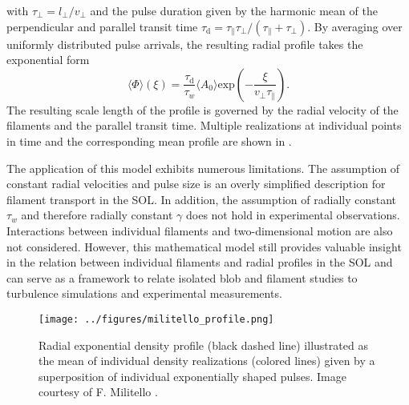 with $\tau_\perp = l_\perp/v_\perp$ and the pulse duration given by the harmonic mean of the perpendicular and parallel transit time $\tau_\mathrm{d} = \tau_\parallel\tau_\perp/(\tau_\parallel+\tau_\perp)$. By averaging over uniformly distributed pulse arrivals, the resulting radial profile takes the exponential form
\begin{equation}
	\langle\Phi\rangle(\xi) = \frac{\tau_\mathrm{d}}{\tau_w}\langle A_0\rangle\mathrm{exp}\left(-\frac{\xi}{v_\perp\tau_\parallel}\right).
\end{equation}
The resulting scale length of the profile is governed by the radial velocity of the filaments and the parallel transit time. Multiple realizations at individual points in time and the corresponding mean profile are shown in . 

The application of this model exhibits numerous limitations. The assumption of constant radial velocities and pulse size is an overly simplified description for filament transport in the SOL. In addition, the assumption of radially constant $\tau_w$ and therefore radially constant $\gamma$ does not hold in experimental observations. Interactions between individual filaments and two-dimensional motion are also not considered. However, this mathematical model still provides valuable insight in the relation between individual filaments and radial profiles in the SOL and can serve as a framework to relate isolated blob and filament studies to turbulence simulations and experimental measurements. 

\begin{figure}[t]
	\centering
	\texttt{[image: ../figures/militello\_profile.png]}
	\caption{Radial exponential density profile (black dashed line) illustrated as the mean of individual density realizations (colored lines) given by a superposition of individual exponentially shaped pulses. Image courtesy of F. Militello \cite{militello_profiles}.}
	\label{Fig:militello}
\end{figure}
